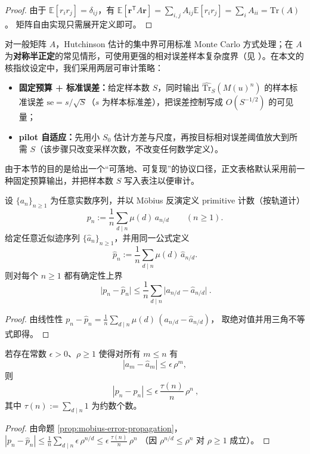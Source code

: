 \begin{proof}
由于 $\mathbb{E}[r_ir_j]=\delta_{ij}$，有
\(
\mathbb{E}[\mathbf r^{\mathsf T}A\mathbf r]=\sum_{i,j}A_{ij}\mathbb{E}[r_ir_j]=\sum_i A_{ii}=\mathrm{Tr}(A)
\)。
矩阵自由实现只需展开定义即可。
\end{proof}

\begin{remark}[误差口径与样本数选择]\label{rem:hutchinson-error}
对一般矩阵 $A$，Hutchinson 估计的集中界可用标准 Monte Carlo 方式处理；在 $A$ 为\textbf{对称半正定}的常见情形，可使用更强的相对误差样本复杂度界（见 \cite{Hutchinson1989ASE,AvronToledo2011Trace}）。在本文的核指纹设定中，我们采用两层可审计策略：
\begin{itemize}
  \item \textbf{固定预算 + 标准误差：}给定样本数 $S$，同时输出 $\widehat{\mathrm{Tr}}_S(M(u)^n)$ 的样本标准误差 $\mathrm{se}=s/\sqrt{S}$（$s$ 为样本标准差），把误差控制写成 $O(S^{-1/2})$ 的可见量；
  \item \textbf{pilot 自适应：}先用小 $S_0$ 估计方差与尺度，再按目标相对误差阈值放大到所需 $S$（该步骤只改变采样次数，不改变任何数学定义）。
\end{itemize}
由于本节的目的是给出一个“可落地、可复现”的协议口径，正文表格默认采用前一种固定预算输出，并把样本数 $S$ 写入表注以便审计。
\end{remark}

\begin{proposition}\label{prop:mobius-error-propagation}
设 \(\{a_n\}_{n\ge 1}\) 为任意实数序列，并以 Möbius 反演定义 primitive 计数（按轨道计）
\[
p_n:=\frac{1}{n}\sum_{d\mid n}\mu(d)\,a_{n/d}\qquad(n\ge 1).
\]
给定任意近似迹序列 \(\{\widehat a_n\}_{n\ge 1}\)，并用同一公式定义
\[
\widehat p_n:=\frac{1}{n}\sum_{d\mid n}\mu(d)\,\widehat a_{n/d}.
\]
则对每个 \(n\ge 1\) 都有确定性上界
\[
\boxed{\ 
\bigl|p_n-\widehat p_n\bigr|
\le \frac{1}{n}\sum_{d\mid n}\bigl|a_{n/d}-\widehat a_{n/d}\bigr|
\ }.
\]
\end{proposition}
\begin{proof}
由线性性
\(
p_n-\widehat p_n=\frac{1}{n}\sum_{d\mid n}\mu(d)\,(a_{n/d}-\widehat a_{n/d})
\)，
取绝对值并用三角不等式即得。
\end{proof}

\begin{corollary}[指数型迹误差 \texorpdfstring{$\Rightarrow$}{=>} primitive 误差的 \texorpdfstring{$\tau(n)/n$}{tau(n)/n} 界]\label{cor:mobius-exp-bound}
\leanverified{paper\_mobius\_exp\_bound}
若存在常数 \(\epsilon>0\)、\(\rho\ge 1\) 使得对所有 \(m\le n\) 有
\[
|a_m-\widehat a_m|\le \epsilon\,\rho^m,
\]
则
\[
\boxed{\ 
|p_n-\widehat p_n|
\le \epsilon\,\frac{\tau(n)}{n}\,\rho^n
\ },
\]
其中 \(\tau(n):=\sum_{d\mid n}1\) 为约数个数。
\end{corollary}
\begin{proof}
由命题 \ref{prop:mobius-error-propagation}，
\(
|p_n-\widehat p_n|
\le \frac{1}{n}\sum_{d\mid n}\epsilon\,\rho^{n/d}
\le \epsilon\,\frac{\tau(n)}{n}\,\rho^n
\)
（因 \(\rho^{n/d}\le \rho^n\) 对 \(\rho\ge 1\) 成立）。
\end{proof}

